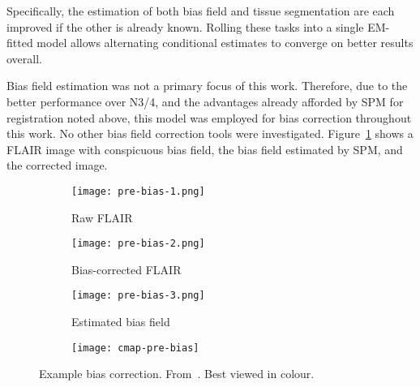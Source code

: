 Specifically, the estimation of both bias field and tissue segmentation are each improved
if the other is already known.
Rolling these tasks into a single EM-fitted model allows
alternating conditional estimates to converge on better results overall.
\par
Bias field estimation was not a primary focus of this work.
Therefore, due to the better performance over N3/4,
and the advantages already afforded by SPM  for registration noted above,
this model was employed for bias correction throughout this work.
No other bias field correction tools were investigated.
Figure~\ref{fig:pre-bias} shows a FLAIR image with conspicuous bias field,
the bias field estimated by SPM, and the corrected image.
\par
\begin{figure}
  \centering
  \begin{subfigure}{0.3\textwidth}
    \centering
    \texttt{[image: pre-bias-1.png]}
    \caption{Raw FLAIR}
  \end{subfigure}
  \begin{subfigure}{0.3\textwidth}
    \centering
    \texttt{[image: pre-bias-2.png]}
    \caption{Bias-corrected FLAIR}
  \end{subfigure}
  \begin{subfigure}{0.30\textwidth}
    \centering
    \texttt{[image: pre-bias-3.png]}
    \caption{Estimated bias field}
  \end{subfigure}
  \begin{subfigure}{0.04\textwidth}
    \texttt{[image: cmap-pre-bias]}
    \\\vphantom{(x)}
  \end{subfigure}
  \caption{Example bias correction. From~\cite{WMHSEG2017}. Best viewed in colour.}%
  \label{fig:pre-bias}
\end{figure}
